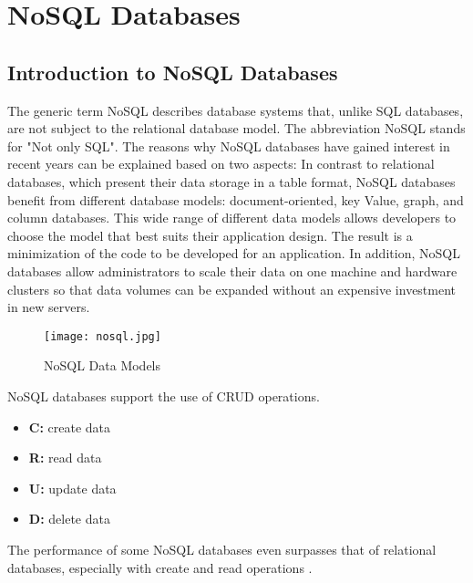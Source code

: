\section{NoSQL Databases}

\subsection{Introduction to NoSQL Databases}
The generic term NoSQL describes database systems that, unlike SQL databases, are not subject to the relational database model. The abbreviation NoSQL stands for "Not only SQL". The reasons why NoSQL databases have gained interest in recent years can be explained based on two aspects: In contrast to relational databases, which present their data storage in a table format, NoSQL databases benefit from different database models: document-oriented, key Value, graph, and column databases. This wide range of different data models allows developers to choose the model that best suits their application design. The result is a minimization of the code to be developed for an application. In addition, NoSQL databases allow administrators to scale their data on one machine and hardware clusters so that data volumes can be expanded without an expensive investment in new servers.
\begin{figure}[H]
	\centering
	\texttt{[image: nosql.jpg]}
	\caption[NoSQL Data Models]{NoSQL Data Models}
\end{figure}

NoSQL databases support the use of CRUD operations.
\begin{itemize}
	\item \textbf{C:} create data
	\item \textbf{R:} read data
	\item \textbf{U:} update data
	\item \textbf{D:} delete data
\end{itemize}
The performance of some NoSQL databases even surpasses that of relational databases, especially with create and read operations \cite{.crud}.
